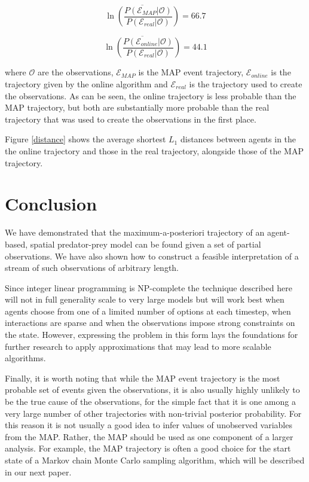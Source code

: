 \documentclass{article}
\begin{document}
\[
\overline{\ln\left(\frac{P(\mathcal{E}_{MAP}|\mathcal{O})}{P(\mathcal{E}_{real}|\mathcal{O})}\right)} = 66.7
\]

\[
\overline{\ln\left(\frac{P(\mathcal{E}_{online}|\mathcal{O})}{P(\mathcal{E}_{real}|\mathcal{O})}\right)} = 44.1
\]

where $\mathcal{O}$ are the observations, $\mathcal{E}_{MAP}$ is the MAP event trajectory, $\mathcal{E}_{online}$ is the trajectory given by the online algorithm and $\mathcal{E}_{real}$ is the trajectory used to create the observations. As can be seen, the online trajectory is less probable than the MAP trajectory, but both are substantially more probable than the real trajectory that was used to create the observations in the first place.

Figure \ref{distance} shows the average shortest $L_1$ distances between agents in the the online trajectory and those in the real trajectory, alongside those of the MAP trajectory.

\section{Conclusion}

We have demonstrated that the maximum-a-posteriori trajectory of an agent-based, spatial predator-prey model can be found given a set of partial observations. We have also shown how to construct a feasible interpretation of a stream of such observations of arbitrary length.

Since integer linear programming is NP-complete the technique described here will not in full generality scale to very large models but will work best when agents choose from one of a limited number of options at each timestep, when interactions are sparse and when the observations impose strong constraints on the state. However, expressing the problem in this form lays the foundations for further research to apply approximations that may lead to more scalable algorithms.

Finally, it is worth noting that while the MAP event trajectory is the most probable set of events given the observations, it is also usually highly unlikely to be the true cause of the observations, for the simple fact that it is one among a very large number of other trajectories with non-trivial posterior probability. For this reason it is not usually a good idea to infer values of unobserved variables from the MAP. Rather, the MAP should be used as one component of a larger analysis. For example, the MAP trajectory is often a good choice for the start state of a Markov chain Monte Carlo sampling algorithm, which will be described in our next paper.

%
% 


\end{document}
